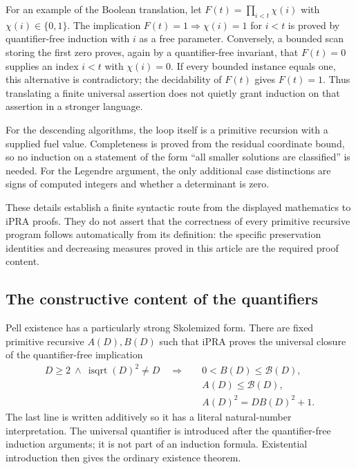 \documentclass[11pt,letterpaper]{article}
\theoremstyle{definition}
\newcommand{\isqrt}{\operatorname{isqrt}}
\newcommand{\CFB}{\mathcal B}
\begin{document}
For an example of the Boolean translation, let
$F(t)=\prod_{i<t}\chi(i)$ with $\chi(i)\in\{0,1\}$.
The implication $F(t)=1\Rightarrow\chi(i)=1$ for $i<t$ is proved by
quantifier-free induction with $i$ as a free parameter. Conversely, a
bounded scan storing the first zero proves, again by a quantifier-free
invariant, that $F(t)=0$ supplies an index $i<t$ with $\chi(i)=0$.
If every bounded instance equals one, this alternative is contradictory;
the decidability of $F(t)$ gives $F(t)=1$. Thus translating a finite
universal assertion does not quietly grant induction on that assertion
in a stronger language.

For the descending algorithms, the loop itself is a primitive recursion
with a supplied fuel value. Completeness is proved from the residual
coordinate bound, so no induction on a statement of the form ``all smaller
solutions are classified'' is needed. For the Legendre argument, the
only additional case distinctions are signs of computed integers and
whether a determinant is zero.

These details establish a finite syntactic route from the displayed
mathematics to iPRA proofs. They do not assert that the correctness of
every primitive recursive program follows automatically from its
definition: the specific preservation identities and decreasing measures
proved in this article are the required proof content.

\subsection{The constructive content of the quantifiers}

Pell existence has a particularly strong Skolemized form. There are fixed
primitive recursive $A(D),B(D)$ such that iPRA proves the universal closure
of the quantifier-free implication
\begin{equation}\label{eq:skolem}
\begin{split}
 D\ge2\ \wedge\ \isqrt(D)^2\ne D\quad\Longrightarrow\quad
 &0<B(D)\le\CFB(D),\\[-2pt]
 &A(D)\le\CFB(D),\\[-2pt]
 &A(D)^2=DB(D)^2+1.
\end{split}
\end{equation}
The last line is written additively so it has a literal natural-number
interpretation. The universal quantifier is introduced after the
quantifier-free induction arguments; it is not part of an induction formula.
Existential introduction then gives the ordinary existence theorem.
\end{document}
